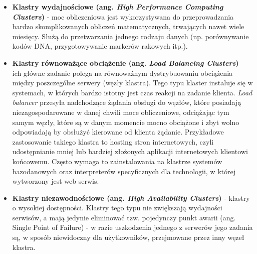 \documentclass[10pt,a4paper,titlepage,twoside]{report}
\begin{document}
\begin{itemize}
	\item \textbf{Klastry wydajnościowe (ang. \textit{High Performance Computing Clusters})} - moc obliczeniowa jest wykorzystywana do przeprowadzania bardzo skomplikowanych obliczeń matematycznych, trwających nawet wiele miesięcy. Służą do przetwarzania jednego rodzaju danych (np. porównywanie kodów DNA, przygotowywanie markerów rakowych itp.).
	\item \textbf{Klastry równoważące obciążenie (ang. \textit{Load Balancing Clusters})} - ich główne zadanie polega na równoważnym dystrybuowaniu obciążenia między poszczególne serwery  (węzły klastra). Tego typu klaster instaluje się w systemach, w których bardzo istotny jest czas reakcji na zadanie klienta. \textit{Load balancer} przesyła nadchodzące żądania obsługi do węzłów, które posiadają niezagospodarowane w danej chwili moce obliczeniowe, odciążając tym samym węzły, które są w danym momencie mocno obciążone i zbyt wolno odpowiadają by obsłużyć kierowane od klienta żądanie. Przykładowe zastosowanie takiego klastra to hosting stron internetowych, czyli udostępnianie mniej lub bardziej złożonych aplikacji internetowych klientowi końcowemu. Często wymaga to zainstalowania na klastrze systemów bazodanowych oraz interpreterów specyficznych dla technologii, w której wytworzony jest web serwis.
	\item \textbf{Klastry niezawodnościowe (ang. \textit{High Availability Clusters})} - klastry o wysokiej dostępności. Klastry tego typu nie zwiększają wydajności serwisów, a mają jedynie eliminować tzw. pojedynczy punkt awarii (ang. Single Point of Failure) - w razie uszkodzenia jednego z serwerów jego zadania są, w sposób niewidoczny dla użytkowników, przejmowane przez inny węzeł klastra.
\end{itemize}
\end{document}
